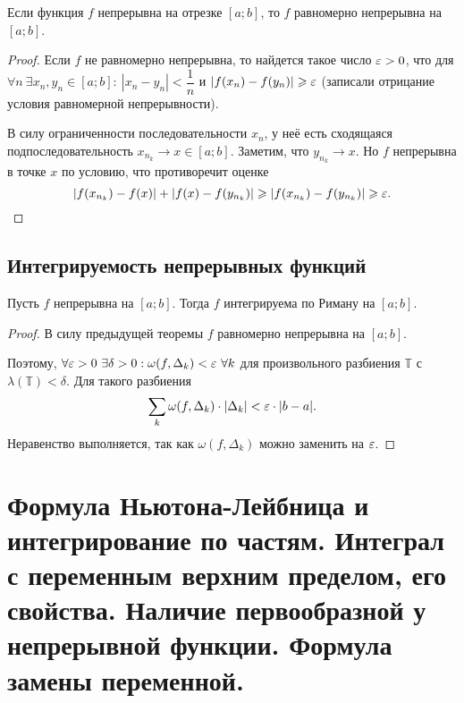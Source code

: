 \documentclass[a4paper]{article}
\theoremstyle{named}
\newcommand{\T}{\mathbb{T}}
\begin{document}
        \begin{theorem*}
            Если функция $f$ непрерывна на отрезке $[a; b]$, то $f$ равномерно непрерывна на $[a; b]$.
        \end{theorem*}

        \begin{proof}
            Если $f$ не равномерно непрерывна, то найдется такое число $\varepsilon > 0$, что для $\forall n \ \exists x_n, y_n \in [a; b]: \ |x_n - y_n| < \dfrac{1}{n}$ и $|f(x_n) - f(y_n)| \geqslant \varepsilon$ (записали отрицание условия равномерной непрерывности). 

            В силу ограниченности последовательности $x_n$, у неё есть сходящаяся подпоследовательность $x_{n_k} \to x \in [a; b]$. Заметим, что $y_{n_k} \to x$. Но $f$ непрерывна в точке $x$ по условию, что противоречит оценке
            \begin{equation*}
                |f(x_{n_k}) - f(x)| + |f(x) - f(y_{n_k})| \geqslant |f(x_{n_k}) - f(y_{n_k})| \geqslant \varepsilon.
            \end{equation*}
        \end{proof}

        \subsection{Интегрируемость непрерывных функций}

        \begin{consequence*}
            Пусть $f$ непрерывна на $[a; b]$. Тогда $f$ интегрируема по Риману на $[a; b]$.
        \end{consequence*}

        \begin{proof}
            В силу предыдущей теоремы $f$ равномерно непрерывна на $[a; b]$.

            Поэтому, $\forall \varepsilon > 0 \ \exists \delta > 0: \omega(f, \Delta_k) < \varepsilon \ \forall k$ для произвольного разбиения $\T$ с $\lambda(\T) < \delta$. Для такого разбиения
            \begin{equation*}
                \sum_k \omega(f, \Delta_k) \cdot |\Delta_k| < \varepsilon \cdot |b - a|.
            \end{equation*}
            Неравенство выполняется, так как $\omega(f, \Delta_k)$ можно заменить на $\varepsilon$.
        \end{proof}

    \section{Формула Ньютона-Лейбница и интегрирование по частям. Интеграл с переменным верхним пределом, его свойства. Наличие первообразной у непрерывной функции. Формула замены переменной.}
\end{document}
